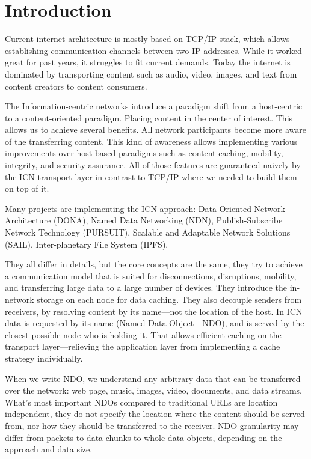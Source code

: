 \chapter{Introduction}
\label{introduction}
Current internet architecture is mostly based on TCP/IP stack, which allows establishing communication channels between two IP addresses. While it worked great for past years, it struggles to fit current demands. Today the internet is dominated by transporting content such as audio, video, images, and text from content creators to content consumers. 

The Information-centric networks introduce a paradigm shift from a host-centric to a content-oriented paradigm. Placing content in the center of interest. This allows us to achieve several benefits. All network participants become more aware of the transferring content. This kind of awareness allows implementing various improvements over host-based paradigms such as content caching, mobility, integrity, and security assurance. All of those features are guaranteed naively by the ICN transport layer in contrast to TCP/IP where we needed to build them on top of it. 

Many projects are implementing the ICN approach: Data-Oriented Network Architecture (DONA), Named Data Networking (NDN), Publish-Subscribe Network Technology (PURSUIT), Scalable and Adaptable Network Solutions (SAIL), Inter-planetary File System (IPFS).

They all differ in details, but the core concepts are the same, they try to achieve a communication model that is suited for disconnections, disruptions, mobility, and transferring large data to a large number of devices. They introduce the in-network storage on each node for data caching. They also decouple senders from receivers, by resolving content by its name---not the location of the host. 
In ICN data is requested by its name (Named Data Object - NDO), and is served by the closest possible node who is holding it. That allows efficient caching on the transport layer---relieving the application layer from implementing a cache strategy individually. 

When we write NDO, we understand any arbitrary data that can be transferred over the network: web page, music, images, video, documents, and data streams. What's most important NDOs compared to traditional URLs are location independent, they do not specify the location where the content should be served from, nor how they should be transferred to the receiver. NDO granularity may differ from packets to data chunks to whole data objects, depending on the approach and data size.

